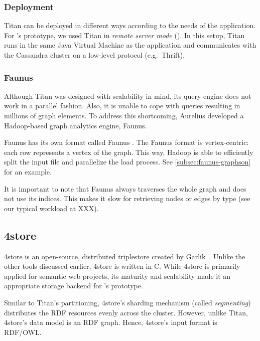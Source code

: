 \subsubsection{Deployment}

Titan can be deployed in different ways according to the needs of the application. For \iqd's prototype, we used Titan in \textit{remote server mode} (). In this setup, Titan runs in the same Java Virtual Machine as the application and communicates with the Cassandra cluster on a low-level protocol (e.g.\ Thrift).


\subsubsection{Faunus}

Although Titan was designed with scalability in mind, its query engine does not work in a parallel fashion. Also, it is unable to cope with queries resulting in millions of graph elements. To address this shortcoming, Aurelius developed a Hadoop-based graph analytics engine, Faunus. %

Faunus has its own format called Faunus \graphson{}. The Faunus \graphson{} format is vertex-centric: each row represents a vertex of the graph. This way, Hadoop is able to efficiently split the input file and parallelize the load process. See \autoref{subsec:faunus-graphson} for an example.


It is important to note that Faunus always traverses the whole graph and does not use its indices. This makes it slow for retrieving nodes or edges by type (see our typical workload at XXX).

\subsection{4store}

4store is an open-source, distributed triplestore created by Garlik~\cite{4store}. Unlike the other tools discussed earlier, 4store is written in C. While 4store is primarily applied for semantic web projects, its maturity and scalability made it an appropriate storage backend for \iqd's prototype.

Similar to Titan's partitioning, 4store's sharding mechanism (called \emph{segmenting}) distributes the RDF resources evenly across the cluster. However, unlike Titan, 4store's data model is an RDF graph. Hence, 4store's input format is RDF/OWL.

